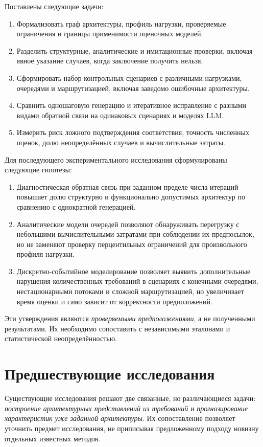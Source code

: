 Поставлены следующие задачи:
\begin{enumerate}
    \item Формализовать граф архитектуры, профиль нагрузки, проверяемые ограничения и границы применимости оценочных моделей.
    \item Разделить структурные, аналитические и имитационные проверки, включая явное указание случаев, когда заключение получить нельзя.
    \item Сформировать набор контрольных сценариев с различными нагрузками, очередями и маршрутизацией, включая заведомо ошибочные архитектуры.
    \item Сравнить одношаговую генерацию и итеративное исправление с разными видами обратной связи на одинаковых сценариях и моделях LLM.
    \item Измерить риск ложного подтверждения соответствия, точность численных оценок, долю неопределённых случаев и вычислительные затраты.
\end{enumerate}

Для последующего экспериментального исследования сформулированы следующие гипотезы:
\begin{enumerate}
    \item Диагностическая обратная связь при заданном пределе числа итераций повышает долю структурно и функционально допустимых архитектур по сравнению с однократной генерацией.
    \item Аналитические модели очередей позволяют обнаруживать перегрузку с небольшими вычислительными затратами при соблюдении их предпосылок, но не заменяют проверку перцентильных ограничений для произвольного профиля нагрузки.
    \item Дискретно-событийное моделирование позволяет выявить дополнительные нарушения количественных требований в сценариях с конечными очередями, нестационарными потоками и сложной маршрутизацией, но увеличивает время оценки и само зависит от корректности предположений.
\end{enumerate}
Эти утверждения являются \emph{проверяемыми предположениями}, а не полученными результатами. Их необходимо сопоставить с независимыми эталонами и статистической неопределённостью.

\section{Предшествующие исследования}

Существующие исследования решают две связанные, но различающиеся задачи: \emph{построение архитектурных представлений из требований} и \emph{прогнозирование характеристик уже заданной архитектуры}. Их сопоставление позволяет уточнить предмет исследования, не приписывая предложенному подходу новизну отдельных известных методов.

